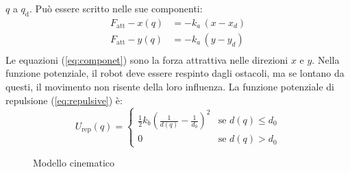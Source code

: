 $q$ a $q_{\text{d}}$. Può essere scritto nelle sue componenti:
\begin{equation}
\label{eq:componet}
\begin{split}
F_{\text{att}} -x(q) &= -k_a \, (x - x_d)\\
F_{\text{att}} -y(q) &= -k_a \, (y - y_d)\\
\end{split}
\end{equation}
%
Le equazioni (\ref{eq:componet}) sono la forza attrattiva nelle direzioni $x$ 
e $y$. Nella funzione potenziale, il robot deve essere respinto dagli ostacoli, 
ma se lontano da questi, il movimento non risente della loro influenza.
La funzione potenziale di repulsione (\ref{eq:repulsive}) è:
\begin{equation}
\label{eq:repulsive}
U_{\text{rep}}(q) = 
\begin{cases} 
\frac{1}{2}k_b(\frac{1}{d(q)}-\frac{1}{d_0})^2 &\mbox{se } d(q) \leq d_0 \\ 
0 & \mbox{se } d(q) > d_0
\end{cases} 
\end{equation}

\begin{figure}[!h]
\centering
    \resizebox{.8\linewidth}{!}{}
\caption{Modello cinematico}
\label{fig:model}
\end{figure}